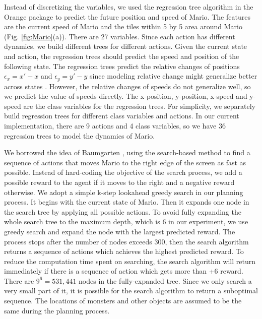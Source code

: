 Instead of discretizing the variables, we used the regression tree algorithm
in the Orange package \cite{Orange04} to predict the future position and speed of Mario.
The features are the current speed of Mario and the tiles within 5 by 5 
area around Mario (Fig. \ref{fig:Mario}(a)). There are 27 variables. 
Since each action has different dynamics, 
we build different trees for different actions. 
Given the current state and action, the regression trees should predict 
the speed and position of the following state. 
The regression trees predict
the relative changes of positions $\epsilon_x = x' - x$ and 
$\epsilon_y = y' - y$ since modeling relative change might generalize better across states \cite{Hester09}.
However, the relative changes of speeds do not generalize well, so we predict
the value of speeds directly.
The x-position, y-position, x-speed and y-speed are the class variables for the regression trees.
For simplicity, we separately build regression trees for different class variables and actions. 
In our current implementation, there are 9 actions and 4 class variables, so we 
have 36 regression trees to model the dynamics of Mario. 

We borrowed the idea of Baumgarten \cite{Robin09}, using
the search-based method to find a sequence of actions that moves Mario to the right edge of the screen as fast as possible.
Instead of hard-coding the objective of the search process, we add a possible reward to the agent if it moves
to the right and a negative reward otherwise.
We adopt a simple k-step lookahead greedy search in our planning process.
It begins with the current state of Mario. 
Then it expands one node in the search tree by applying all possible actions. 
To avoid fully expanding the whole search tree to 
the maximum depth, which is 6 in our experiment, we use greedy search and expand the node
with the largest predicted reward. 
The process stops after the number of nodes exceeds 300, then the search algorithm returns 
a sequence of actions which achieves the highest predicted reward.
To reduce the computation time spent on searching, the search algorithm will return
immediately if there is a sequence of action which gets more than +6 reward.
There are $9^6=531,441$ nodes in the fully-expanded tree. 
Since we only search a very small part of it, it is possible for the search algorithm
to return a suboptimal sequence.
The locations of monsters and other objects are assumed to be the same
during the planning process. 

